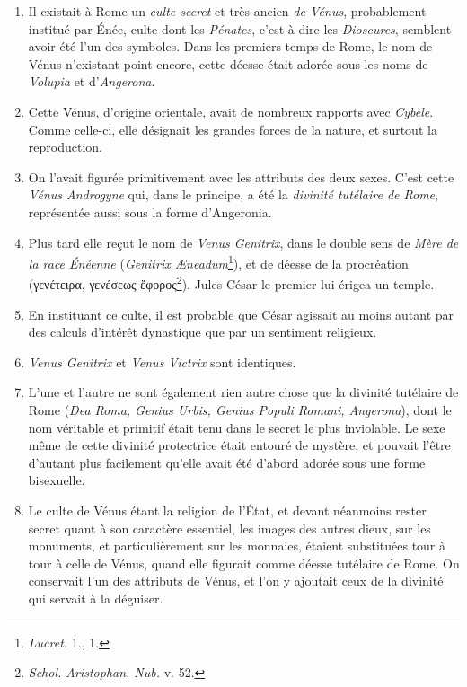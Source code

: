 \documentclass[a4paper, 11pt, oneside, polutonikogreek, french]{article}
\begin{document}
\begin{enumerate}
    \item Il existait à Rome un \emph{culte secret} et très-ancien \emph{de Vénus}, probablement institué par Énée, culte dont les \emph{Pénates}, c'est-à-dire les \emph{Dioscures}, semblent avoir été l'un des symboles. Dans les premiers temps de Rome, le nom de Vénus n'existant point encore, cette déesse était adorée sous les noms de \emph{Volupia} et d'\emph{Angerona}.

    \item Cette Vénus, d'origine orientale, avait de nombreux rapports avec \emph{Cybèle}. Comme celle-ci, elle désignait les grandes forces de la nature, et surtout la reproduction.

    \item On l'avait figurée primitivement avec les attributs des deux sexes. C'est cette \emph{Vénus Androgyne} qui, dans le principe, a été la \emph{divinité tutélaire de Rome}, représentée aussi sous la forme d'Angeronia.

    \item Plus tard elle reçut le nom de \emph{Venus Genitrix}, dans le double sens de \emph{Mère de la race Énéenne} (\emph{Genitrix Æneadum}\footnote{\emph{Lucret.} 1., 1.}), et de déesse de la procréation (γενέτειρα, γενέσεως ἔφορος\footnote{\emph{Schol. Aristophan. Nub.} v. 52.}). Jules César le premier lui érigea un temple.

    \item En instituant ce culte, il est probable que César agissait au moins autant par des calculs d'intérêt dynastique que par un sentiment religieux.

    \item \emph{Venus Genitrix} et \emph{Venus Victrix} sont identiques.

    \item L'une et l'autre ne sont également rien autre chose que la divinité tutélaire de Rome (\emph{Dea Roma, Genius Urbis, Genius Populi Romani, Angerona}), dont le nom véritable et primitif était tenu dans le secret le plus inviolable. Le sexe même de cette divinité protectrice était entouré de mystère, et pouvait l'être d'autant plus facilement qu'elle avait été d'abord adorée sous une forme bisexuelle.

    \item Le culte de Vénus étant la religion de l'État, et devant néanmoins rester secret quant à son caractère essentiel, les images des autres dieux, sur les monuments, et particulièrement sur les monnaies, étaient substituées tour à tour à celle de Vénus, quand elle figurait comme déesse tutélaire de Rome. On conservait l'un des attributs de Vénus, et l'on y ajoutait ceux de la divinité qui servait à la déguiser.


\end{enumerate}
\end{document}
